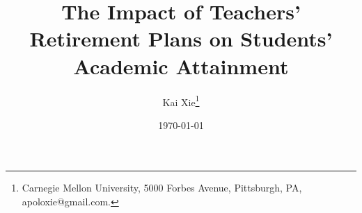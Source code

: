 \documentclass[AER]{AEA}
\begin{document}
\title{The Impact of Teachers' Retirement Plans on Students' Academic Attainment}
\author{Kai Xie\thanks{Carnegie Mellon University, 5000 Forbes Avenue,
Pittsburgh, PA, apoloxie@gmail.com.}}
\date{\today}



\maketitle










\appendix


\end{document}
